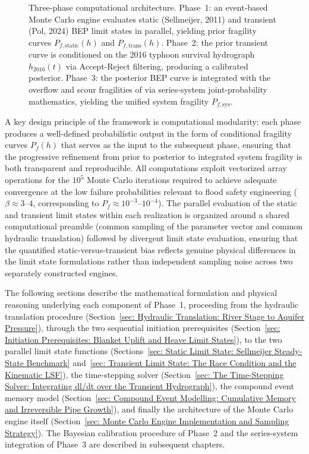 \begin{figure}[H]
\begin{tikzpicture}
    \end{tikzpicture}
    \caption{Three-phase computational architecture. Phase~1: an event-based Monte Carlo engine evaluates static (Sellmeijer, 2011) and transient (Pol, 2024) BEP limit states in parallel, yielding prior fragility curves $P_{f,\mathrm{static}}(h)$ and $P_{f,\mathrm{trans}}(h)$. Phase~2: the prior transient curve is conditioned on the 2016 typhoon survival hydrograph $h_{2016}(t)$ via Accept-Reject filtering, producing a calibrated posterior. Phase~3: the posterior BEP curve is integrated with the overflow and scour fragilities of \textcite{uemura_phd_2025} via series-system joint-probability mathematics, yielding the unified system fragility $P_{f,\mathrm{sys}}$.} \label{fig:updated_research_flow_v8}
\end{figure}

A key design principle of the framework is computational modularity: each
phase produces a well-defined probabilistic output in the form of conditional
fragility curves $P_f(h)$ that serves as the input to the subsequent phase,
ensuring that the progressive refinement from prior to posterior to integrated
system fragility is both transparent and reproducible. All computations exploit
vectorized array operations for the $10^5$ Monte Carlo iterations required to
achieve adequate convergence at the low failure probabilities relevant to flood
safety engineering ($\beta \approx 3$--$4$, corresponding to
$P_f \approx 10^{-3}$--$10^{-4}$). The parallel evaluation of the static and
transient limit states within each realization is organized around a shared
computational preamble (common sampling of the parameter vector and common
hydraulic translation) followed by divergent limit state evaluation, ensuring
that the quantified static-versus-transient bias reflects genuine physical
differences in the limit state formulations rather than independent sampling
noise across two separately constructed engines.

The following sections describe the mathematical formulation and physical
reasoning underlying each component of Phase~1, proceeding from the hydraulic
translation procedure
(Section~\ref{sec: Hydraulic Translation: River Stage to Aquifer Pressure}),
through the two sequential initiation prerequisites
(Section~\ref{sec: Initiation Prerequisites: Blanket Uplift and Heave Limit States}),
to the two parallel limit state functions
(Sections~\ref{sec: Static Limit State: Sellmeijer Steady-State Benchmark}
and~\ref{sec: Transient Limit State: The Race Condition and the Kinematic LSF}),
the time-stepping solver
(Section~\ref{sec: The Time-Stepping Solver: Integrating dl/dt over the Transient Hydrograph}),
the compound event memory model
(Section~\ref{sec: Compound Event Modelling: Cumulative Memory and Irreversible Pipe Growth}),
and finally the architecture of the Monte Carlo engine itself
(Section~\ref{sec: Monte Carlo Engine Implementation and Sampling Strategy}).
The Bayesian calibration procedure of Phase~2 and the series-system
integration of Phase~3 are described in subsequent chapters.

